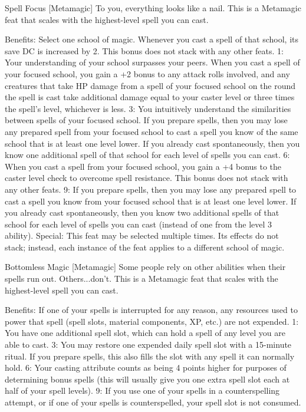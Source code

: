Spell Focus [Metamagic]
To you, everything looks like a nail.
This is a Metamagic feat that scales with the highest-level spell you can cast.

Benefits: Select one school of magic. Whenever you cast a spell of that school, its save DC is increased by 2. This bonus does not stack with any other feats.
1: Your understanding of your school surpasses your peers. When you cast a spell of your focused school, you gain a +2 bonus to any attack rolls involved, and any creatures that take HP damage from a spell of your focused school on the round the spell is cast take additional damage equal to your caster level or three times the spell's level, whichever is less.
3: You intuitively understand the similarities between spells of your focused school. If you prepare spells, then you may lose any prepared spell from your focused school to cast a spell you know of the same school that is at least one level lower. If you already cast spontaneously, then you know one additional spell of that school for each level of spells you can cast.
6: When you cast a spell from your focused school, you gain a +4 bonus to the caster level check to overcome spell resistance. This bonus does not stack with any other feats.
9: If you prepare spells, then you may lose any prepared spell to cast a spell you know from your focused school that is at least one level lower. If you already cast spontaneously, then you know two additional spells of that school for each level of spells you can cast (instead of one from the level 3 ability).
Special: This feat may be selected multiple times. Its effects do not stack; instead, each instance of the feat applies to a different school of magic.


Bottomless Magic [Metamagic]
Some people rely on other abilities when their spells run out. Others...don't.
This is a Metamagic feat that scales with the highest-level spell you can cast.

Benefits: If one of your spells is interrupted for any reason, any resources used to power that spell (spell slots, material components, XP, etc.) are not expended.
1: You have one additional spell slot, which can hold a spell of any level you are able to cast.
3: You may restore one expended daily spell slot with a 15-minute ritual. If you prepare spells, this also fills the slot with any spell it can normally hold.
6: Your casting attribute counts as being 4 points higher for purposes of determining bonus spells (this will usually give you one extra spell slot each at half of your spell levels).
9: If you use one of your spells in a counterspelling attempt, or if one of your spells is counterspelled, your spell slot is not consumed.


